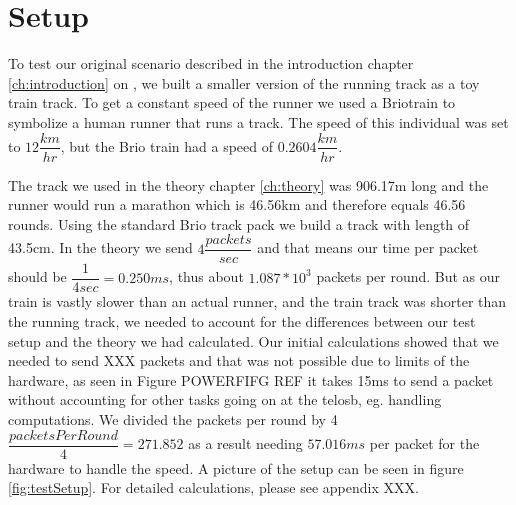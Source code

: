 \section{Setup}\label{sc:setup}

To test our original scenario described in the introduction chapter \ref{ch:introduction} on \pageref{ch:introduction}, we built a smaller version of the running track as a toy train track. To get a constant speed of the runner we used a Brio\texttrademark train to symbolize a human runner that runs a track. The speed of this individual was set to $12\dfrac{km}{hr}$, but the Brio train had a speed of $0.2604\dfrac{km}{hr}$.

\noindent The track we used in the theory chapter \ref{ch:theory} was 906.17m long and the runner would run a marathon which is 46.56km and therefore equals 46.56 rounds. Using the standard Brio track pack we build a track with length of 43.5cm. In the theory we send $4\dfrac{packets}{sec}$ and that means our time per packet should be $\dfrac{1}{4sec} = 0.250ms$, thus about $1.087*10^3$ packets per round. But as our train is vastly slower than an actual runner, and the train track was shorter than the running track, we needed to account for the differences between our test setup and the theory we had calculated. Our initial calculations showed that we needed to send XXX packets and that was not possible due to limits of the hardware, as seen in Figure POWERFIFG REF it takes 15ms to send a packet without accounting for other tasks going on at the telosb, eg. handling computations. We divided the packets per round by 4 $ \dfrac{packetsPerRound}{4} = 271.852 $ as a result needing $57.016 ms$ per packet for the hardware to handle the speed. A picture of the setup can be seen in figure \ref{fig:testSetup}. For detailed calculations, please see appendix XXX.
